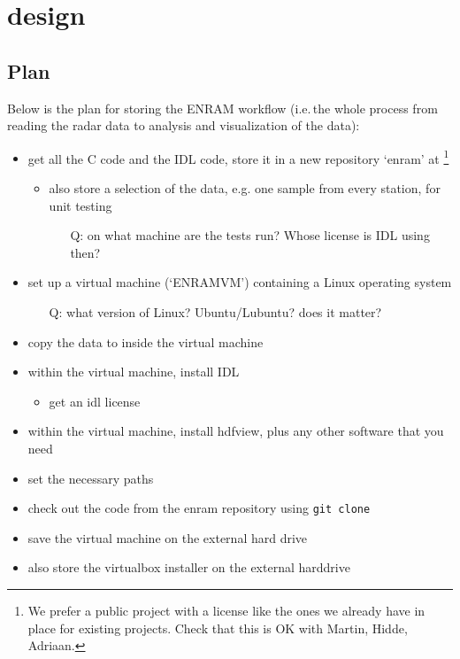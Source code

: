 \chapter{design}
\label{ch:design}


\section{Plan}

Below is the plan for storing the ENRAM workflow (i.e.\,the whole process from reading the radar data to analysis and visualization of the data):

\begin{itemize}
\item{get all the C code and the IDL code, store it in a new repository `enram' at \footnote{We prefer a public project with a license like the ones we already have in place for existing projects. Check that this is OK with Martin, Hidde, Adriaan.}}
\begin{itemize}
\item{also store a selection of the data, e.g. one sample from every station, for unit testing}
\begin{itemize}
\item[Q:]{on what machine are the tests run? Whose license is IDL using then?}
\end{itemize}
\end{itemize}
\item{set up a virtual machine (`ENRAMVM') containing a Linux operating system}
\begin{itemize}
\item[Q:]{what version of Linux? Ubuntu/Lubuntu? does it matter?}
\end{itemize}
\item{copy the data to inside the virtual machine}
\item{within the virtual machine, install IDL}
\begin{itemize}
\item{get an idl license}
\end{itemize}
\item{within the virtual machine, install hdfview, plus any other software that you need}
\item{set the necessary paths}
\item{check out the code from the enram repository using \texttt{git clone}}
\item{save the virtual machine on the external hard drive}
\item{also store the virtualbox installer on the external harddrive}
\end{itemize}

